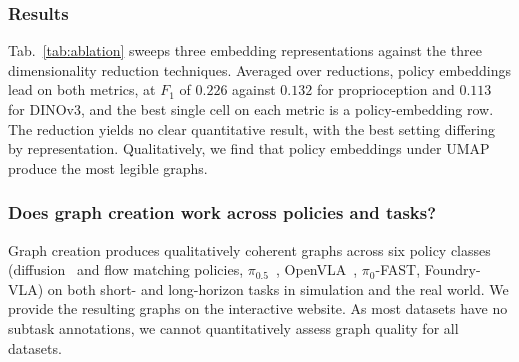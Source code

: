 \documentclass[letterpaper, 10 pt, conference]{ieeeconf}
\begin{document}
\subsubsection{Results}

Tab.~\ref{tab:ablation} sweeps three embedding representations against the three dimensionality reduction techniques. Averaged over reductions, policy embeddings lead on both metrics, at $F_1$ of $0.226$ against $0.132$ for proprioception and $0.113$ for DINOv3, and the best single cell on each metric is a policy-embedding row. The reduction yields no clear quantitative result, with the best setting differing by representation. Qualitatively, we find that policy embeddings under UMAP produce the most legible graphs.

\subsubsection{Does graph creation work across policies and tasks?}

Graph creation produces qualitatively coherent graphs across six policy classes (diffusion~\cite{chi_diffusion_2023} and flow matching policies, $\pi_{0.5}$~\cite{pi05_2025}, OpenVLA~\cite{kim_openvla_2024}, $\pi_0$-FAST, Foundry-VLA) on both short- and long-horizon tasks in simulation and the real world. We provide the resulting graphs on the interactive website. As most datasets have no subtask annotations, we cannot quantitatively assess graph quality for all datasets.


\end{document}
